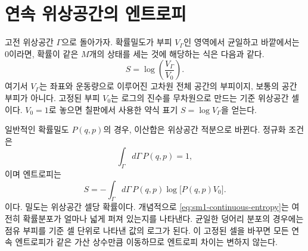 \begin{classroomqa}
\end{classroomqa}

\begin{classroomqa}
\end{classroomqa}

\section{연속 위상공간의 엔트로피}

고전 위상공간 \(\Gamma\)으로 돌아가자. 확률밀도가 부피 \(V_\Gamma\)인 영역에서 균일하고 바깥에서는 0이라면, 확률이 같은 \(M\)개의 상태를 세는 것에 해당하는 식은 다음과 같다.
\begin{equation}
 S=\log\!\left(\frac{V_\Gamma}{V_0}\right).
 \label{eq:sm1-continuous-uniform}
\end{equation}
여기서 \(V_\Gamma\)는 좌표와 운동량으로 이루어진 고차원 전체 공간의 부피이지, 보통의 공간 부피가 아니다. 고정된 부피 \(V_0\)는 로그의 진수를 무차원으로 만드는 기준 위상공간 셀이다. \(V_0=1\)로 놓으면 칠판에서 사용한 약식 표기 \(S=\log V_\Gamma\)을 얻는다.

일반적인 확률밀도 \(P(q,p)\)의 경우, 이산합은 위상공간 적분으로 바뀐다. 정규화 조건은
\begin{equation}
 \int_\Gamma d\Gamma\,P(q,p)=1,
 \label{eq:sm1-continuous-normalization}
\end{equation}
이며 엔트로피는
\begin{equation}
 S=-\int_\Gamma d\Gamma\,
 P(q,p)\log\!\bigl[P(q,p)V_0\bigr].
 \label{eq:sm1-continuous-entropy}
\end{equation}
이다. 밀도는 위상공간 셀당 확률이다. 개념적으로 \eqref{eq:sm1-continuous-entropy}는 여전히 확률분포가 얼마나 넓게 퍼져 있는지를 나타낸다. 균일한 덩어리 분포의 경우에는 점유 부피를 기준 셀 단위로 나타낸 값의 로그가 된다. 이 고정된 셀을 바꾸면 모든 연속 엔트로피가 같은 가산 상수만큼 이동하므로 엔트로피 차이는 변하지 않는다.

